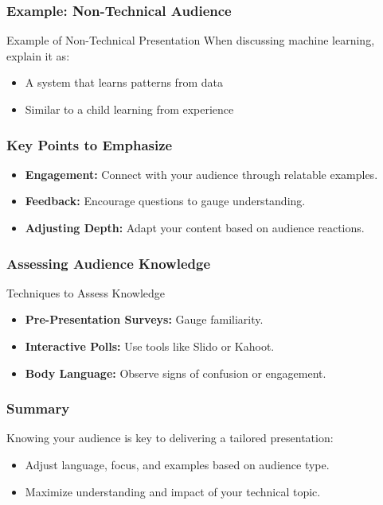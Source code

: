 \documentclass[aspectratio=169]{beamer}
\begin{document}
\begin{frame}[fragile]
    \frametitle{Example: Non-Technical Audience}
    \begin{block}{Example of Non-Technical Presentation}
        When discussing machine learning, explain it as:
        \begin{itemize}
            \item A system that learns patterns from data
            \item Similar to a child learning from experience
        \end{itemize}
    \end{block}
\end{frame}

\begin{frame}[fragile]
    \frametitle{Key Points to Emphasize}
    \begin{itemize}
        \item \textbf{Engagement:} Connect with your audience through relatable examples.
        \item \textbf{Feedback:} Encourage questions to gauge understanding.
        \item \textbf{Adjusting Depth:} Adapt your content based on audience reactions.
    \end{itemize}
\end{frame}

\begin{frame}[fragile]
    \frametitle{Assessing Audience Knowledge}
    \begin{block}{Techniques to Assess Knowledge}
        \begin{itemize}
            \item \textbf{Pre-Presentation Surveys:} Gauge familiarity.
            \item \textbf{Interactive Polls:} Use tools like Slido or Kahoot.
            \item \textbf{Body Language:} Observe signs of confusion or engagement.
        \end{itemize}
    \end{block}
\end{frame}

\begin{frame}[fragile]
    \frametitle{Summary}
    Knowing your audience is key to delivering a tailored presentation:
    \begin{itemize}
        \item Adjust language, focus, and examples based on audience type.
        \item Maximize understanding and impact of your technical topic.
    \end{itemize}
\end{frame}
\end{document}

